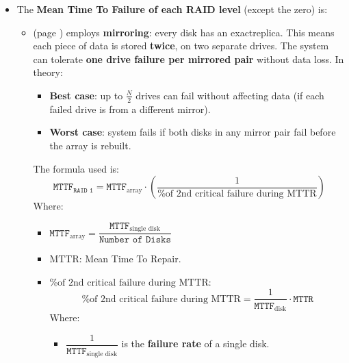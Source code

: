 \begin{itemize}
    \item The \textbf{Mean Time To Failure of each RAID level} (except the zero) is:
    \begin{itemize}
        \item {} (page ) employs \textbf{mirroring}: every disk has an exact\break replica. This means each piece of data is stored \textbf{twice}, on two separate drives. The system can tolerate \textbf{one drive failure per mirrored pair} without data loss. In theory:
        \begin{itemize}
            \item[\textcolor{Green3}{\faIcon{check}}] \textcolor{Green3}{\textbf{Best case}}: up to $\frac{N}{2}$ drives can fail without affecting data (if each failed drive is from a different mirror).
            \item[\textcolor{Red2}{\faIcon{times}}] \textcolor{Red2}{\textbf{Worst case}}: system fails if both disks in any mirror pair fail before the array is rebuilt.
        \end{itemize}
        The formula used is:
        \begin{equation}
            \texttt{MTTF}_{\texttt{RAID 1}} = \texttt{MTTF}_{\text{array}} \cdot \left(
                \dfrac{1}{\text{\% of 2nd critical failure during MTTR}}
            \right)
        \end{equation}
        Where:
        \begin{itemize}
            \item $\texttt{MTTF}_{\text{array}} = \dfrac{\texttt{MTTF}_{\text{single disk}}}{\texttt{Number of Disks}}$
            \item $\text{MTTR}$: Mean Time To Repair.
            \item $\text{\% of 2nd critical failure during MTTR}$:
            \begin{equation}\label{eq: RAID 1 - probability of 2nd critical failure during MTTR}
                \text{\% of 2nd critical failure during MTTR} = \frac{1}{\texttt{MTTF}_{\text{disk}}} \cdot \texttt{MTTR}
            \end{equation}
            Where:
            \begin{itemize}
                \item $\dfrac{1}{\texttt{MTTF}_{\text{single disk}}}$ is the \textbf{failure rate} of a single disk.
                

\end{itemize}
\end{itemize}
\end{itemize}
\end{itemize}
